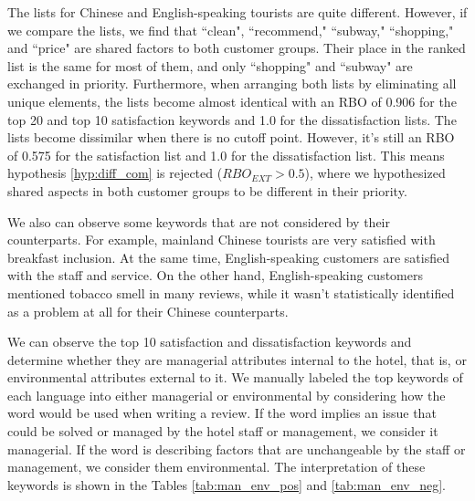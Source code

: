 \documentclass[smallextended,natbib]{svjour3}       %
\begin{document}
The lists for Chinese and English-speaking tourists are quite different. However, if we compare the lists, we find that ``clean", ``recommend," ``subway," ``shopping,"  and ``price" are shared factors to both customer groups. Their place in the ranked list is the same for most of them, and only ``shopping" and ``subway" are exchanged in priority. Furthermore, when arranging both lists by eliminating all unique elements, the lists become almost identical with an RBO of 0.906 for the top 20 and top 10 satisfaction keywords and 1.0 for the dissatisfaction lists. The lists become dissimilar when there is no cutoff point. However, it's still an RBO of 0.575 for the satisfaction list and 1.0 for the dissatisfaction list. This means hypothesis \ref{hyp:diff_com} is rejected (\(RBO_{EXT} > 0.5\)), where we hypothesized shared aspects in both customer groups to be different in their priority.

We also can observe some keywords that are not considered by their counterparts. For example, mainland Chinese tourists are very satisfied with breakfast inclusion. At the same time, English-speaking customers are satisfied with the staff and service. On the other hand, English-speaking customers mentioned tobacco smell in many reviews, while it wasn't statistically identified as a problem at all for their Chinese counterparts.

We can observe the top 10 satisfaction and dissatisfaction keywords and determine whether they are managerial attributes internal to the hotel, that is, or environmental attributes external to it. We manually labeled the top keywords of each language into either managerial or environmental by considering how the word would be used when writing a review. If the word implies an issue that could be solved or managed by the hotel staff or management, we consider it managerial. If the word is describing factors that are unchangeable by the staff or management, we consider them environmental. The interpretation of these keywords is shown in the Tables \ref{tab:man_env_pos} and \ref{tab:man_env_neg}.
\end{document}

